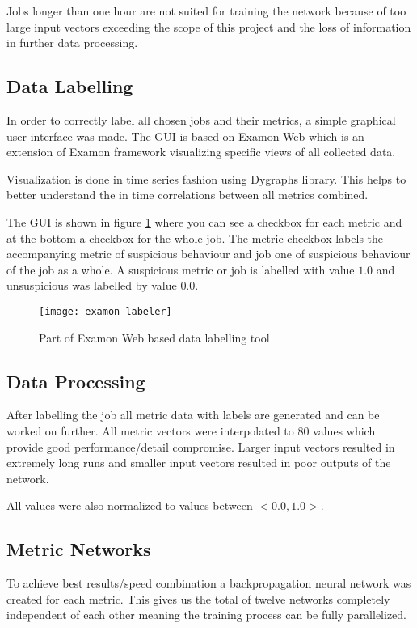 Jobs longer than one hour are not suited for training the network because of too large input vectors exceeding the scope of this project and the loss of information in further data processing.

\subsection{Data Labelling}
In order to correctly label all chosen jobs and their metrics, a simple graphical user interface was made. The GUI is based on Examon Web which is an extension of Examon framework visualizing specific views of all collected data.

Visualization is done in time series fashion using Dygraphs library. This helps to better understand the in time correlations between all metrics combined.

The GUI is shown in figure \ref{fig:ex-labeler} where you can see a checkbox for each metric and at the bottom a checkbox for the whole job. The metric checkbox labels the accompanying metric of suspicious behaviour and job one of suspicious behaviour of the job as a whole. A suspicious metric or job is labelled with value $1.0$ and unsuspicious was labelled by value $0.0$.

\begin{figure}[ht]
    \centering
    \texttt{[image: examon-labeler]}
    \caption{Part of Examon Web based data labelling tool}
    \label{fig:ex-labeler}
\end{figure}

\subsection{Data Processing}

After labelling the job all metric data with labels are generated and can be worked on further. All metric vectors were interpolated to 80 values which provide good performance/detail compromise. Larger input vectors resulted in extremely long runs and smaller input vectors resulted in poor outputs of the network.

All values were also normalized to values between $<0.0, 1.0>$.

\subsection{Metric Networks}

To achieve best results/speed combination a backpropagation neural network was created for each metric. This gives us the total of twelve networks completely independent of each other meaning the training process can be fully parallelized.

